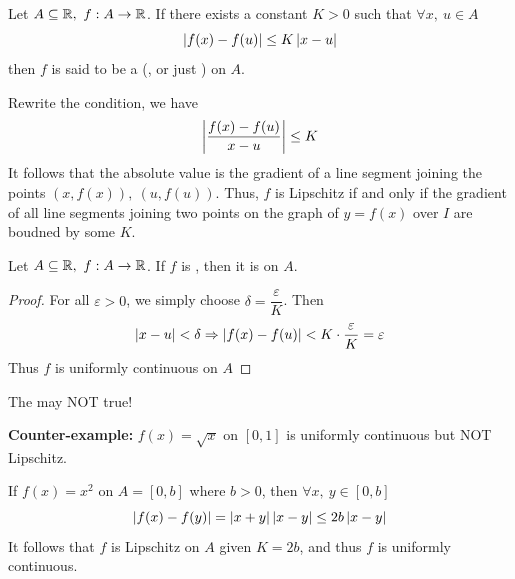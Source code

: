 \documentclass[a4paper,12pt]{article}
\begin{document}
\begin{definition}
    Let \(A\subseteq\R,\ f:A\rightarrow\R\). If there exists a constant \(K>0\) such that \(\forall x,\ u\in A\)
    \[\left\lvert f(x)-f(u)\right\rvert\le K\left\lvert x-u\right\rvert\]
    then \(f\) is said to be a  (, or just ) on \(A\).\\
\end{definition}

\begin{remark}
    Rewrite the condition, we have \[\left\lvert \frac{f(x)-f(u)}{x-u}\right\rvert\le K\]
    It follows that the absolute value is the gradient of a line segment joining the points \((x,f(x)),\ (u,f(u))\). 
    Thus, \(f\) is Lipschitz if and only if the gradient of all line segments joining two points on the graph of \(y=f(x)\) over \(I\) are boudned by some \(K\).\\
\end{remark}

\begin{theorem}
    Let \(A\subseteq\R,\ f:A\rightarrow\R\). If \(f\) is , then it is  on \(A\).
    \begin{proof}
        For all \(\varepsilon>0\), we simply choose \(\delta=\dfrac{\varepsilon }{K}\). Then 
        \[\left\lvert x-u\right\rvert<\delta\Rightarrow\left\lvert f(x)-f(u)\right\rvert<K\cdot\frac{\varepsilon }{K }=\varepsilon\]
        Thus \(f\) is uniformly continuous on \(A\)
    \end{proof}
\end{theorem}

\begin{remark}
    The  may NOT true!

    \textbf{Counter-example:} \(f(x)=\sqrt{x}\) on \([0,1]\) is uniformly continuous but NOT Lipschitz.\\
\end{remark}

\begin{example}
    If \(f(x)=x^2\) on \(A=[0,b]\) where \(b>0\), then \(\forall x,\ y\in [0,b]\)
    \[\left\lvert f(x)-f(y)\right\rvert=\left\lvert x+y\right\rvert\left\lvert x-y\right\rvert\le 2b\left\lvert x-y\right\rvert\]
    It follows that \(f\) is Lipschitz on \(A\) given \(K=2b\), and thus \(f\) is uniformly continuous.\\
\end{example}
\end{document}
